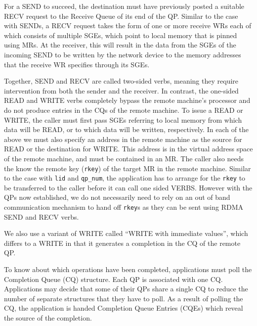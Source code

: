 For a SEND to succeed, the destination must have previously posted a suitable
RECV request to the Receive Queue of its end of the QP. Similar to the case with SENDs,
a RECV request takes the form of one or more receive WRs each of which
consists of multiple SGEs, which point to local memory that is pinned using
MRs. At the receiver, this will result in the data from the SGEs of the incoming
SEND to be written by the network device to the memory addresses that the
receive WR specifies through its SGEs.

Together, SEND and RECV are called two-sided verbs, meaning they require
intervention from both the sender and the receiver. In contrast, the one-sided
READ and WRITE verbs completely bypass the remote machine's processor and do not
produce entries in the CQs of the remote machine. To
issue a READ or WRITE, the caller must first pass SGEs referring to local memory
from which data will be READ, or to which data will be written, respectively.
In each of the above we must also specify an address in the remote machine
as the source for READ or the destination for WRITE. This address is in
the virtual address space of the remote machine, and must be contained in an
MR. The caller also needs the know the remote key (\texttt{rkey}) of the target
MR in the remote machine. Similar to the case with \texttt{lid} and
\texttt{qp\_num}, the application has to arrange for the \texttt{rkey} to be
transferred to the caller before it can call one sided VERBS. However with the
QPs now established, we do not necessarily need to rely on an out of band
communication mechanism to hand off \texttt{rkey}s as they can be sent using
RDMA SEND and RECV verbs.

We also use a variant of WRITE called ``WRITE with immediate values'', which
differs to a WRITE in that it generates a completion in the CQ of the
remote QP.

To know about which operations have been completed, applications must poll the
Completion Queue (CQ) structure.
Each QP is associated with one CQ. Applications may decide that some of their
QPs share a single CQ to reduce the number of separate structures that they
have to poll. As a result of polling the CQ, the application is handed
Completion Queue Entries (CQEs) which reveal the source of the completion.

